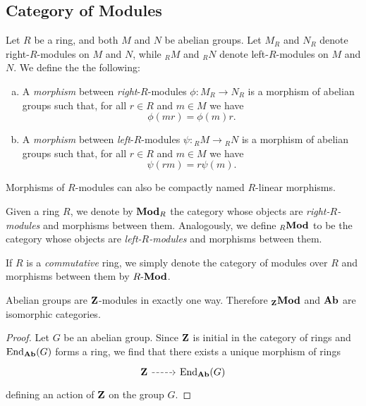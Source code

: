 \subsection{Category of Modules}

\begin{definition}
\label{def:morphisms-of-modules}
Let \(R\) be a ring, and both \(M\) and \(N\) be abelian groups. Let \(M_R\) and
\(N_R\) denote right-\(R\)-modules on \(M\) and \(N\), while \({}_RM\) and
\({}_RN\) denote left-\(R\)-modules on \(M\) and \(N\). We define the the
following:
\begin{enumerate}[(a)]\setlength\itemsep{0em}
\item A \emph{morphism} between \emph{right}-\(R\)-modules \(\phi: M_R \to N_R\)
  is a morphism of abelian groups such that, for all \(r \in R\) and \(m \in M\)
  we have
  \[
  \phi(m r) = \phi(m) r.
  \]
\item A \emph{morphism} between \emph{left}-\(R\)-modules
  \(\psi: {}_RM \to {}_RN\) is a morphism of abelian groups such that, for all
  \(r \in R\) and \(m \in M\) we have
  \[
  \psi(r m) = r \psi(m).
  \]
\end{enumerate}
Morphisms of \(R\)-modules can also be compactly named \(R\)-linear morphisms.
\end{definition}

\begin{definition}
\label{def:category-of-R-Mod}
Given a ring \(R\), we denote by \({\textbf{Mod}_{R}}\) the category whose objects are
\emph{right-\(R\)-modules} and morphisms between them. Analogously, we define
\({{}_{R}\textbf{Mod}}\) to be the category whose objects are \emph{left-\(R\)-modules} and
morphisms between them.

If \(R\) is a \emph{commutative} ring, we simply denote the category of modules
over \(R\) and morphisms between them by \({R\text{-}\textbf{Mod}}\).
\end{definition}

\begin{proposition}[\(\Z\)-modules]
\label{prop:abelian-groups-are-Z-modules}
Abelian groups are \(\Z\)-modules in exactly one way. Therefore \({{}_{\mathbf{Z}}\textbf{Mod}}\)
and \({\textbf{Ab}}\) are isomorphic categories.
\end{proposition}

\begin{proof}
Let \(G\) be an abelian group. Since \(\Z\) is initial in the category of rings
and \(\operatorname{End}_{{\textbf{Ab}}}(G)\) forms a ring, we find that there exists a unique morphism
of rings
\[
\begin{tikzcd}
\Z \ar[r, dashed] &\End_{\Ab}(G)
\end{tikzcd}
\]
defining an action of \(\Z\) on the group \(G\).
\end{proof}

